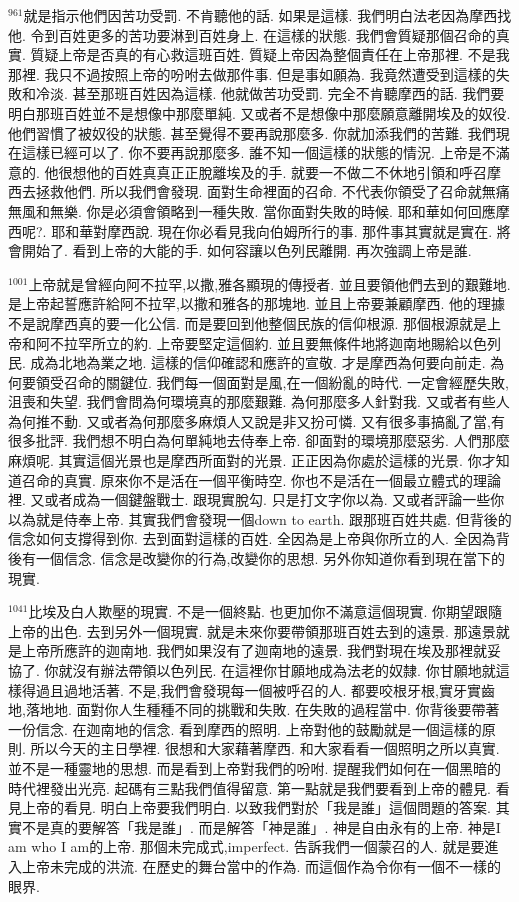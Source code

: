 \documentclass{book}
\begin{document}
$^{961}$就是指示他們因苦功受罰.
不肯聽他的話.
如果是這樣.
我們明白法老因為摩西找他.
令到百姓更多的苦功要淋到百姓身上.
在這樣的狀態.
我們會質疑那個召命的真實.
質疑上帝是否真的有心救這班百姓.
質疑上帝因為整個責任在上帝那裡.
不是我那裡.
我只不過按照上帝的吩咐去做那件事.
但是事如願為.
我竟然遭受到這樣的失敗和冷淡.
甚至那班百姓因為這樣.
他就做苦功受罰.
完全不肯聽摩西的話.
我們要明白那班百姓並不是想像中那麼單純.
又或者不是想像中那麼願意離開埃及的奴役.
他們習慣了被奴役的狀態.
甚至覺得不要再說那麼多.
你就加添我們的苦難.
我們現在這樣已經可以了.
你不要再說那麼多.
誰不知一個這樣的狀態的情況.
上帝是不滿意的.
他很想他的百姓真真正正脫離埃及的手.
就要一不做二不休地引領和呼召摩西去拯救他們.
所以我們會發現.
面對生命裡面的召命.
不代表你領受了召命就無痛無風和無樂.
你是必須會領略到一種失敗.
當你面對失敗的時候.
耶和華如何回應摩西呢?.
耶和華對摩西說.
現在你必看見我向伯姆所行的事.
那件事其實就是實在.
將會開始了.
看到上帝的大能的手.
如何容讓以色列民離開.
再次強調上帝是誰.

$^{1001}$上帝就是曾經向阿不拉罕,以撒,雅各顯現的傳授者.
並且要領他們去到的艱難地.
是上帝起誓應許給阿不拉罕,以撒和雅各的那塊地.
並且上帝要兼顧摩西.
他的理據不是說摩西真的要一化公信.
而是要回到他整個民族的信仰根源.
那個根源就是上帝和阿不拉罕所立的約.
上帝要堅定這個約.
並且要無條件地將迦南地賜給以色列民.
成為北地為業之地.
這樣的信仰確認和應許的宣敬.
才是摩西為何要向前走.
為何要領受召命的關鍵位.
我們每一個面對是風,在一個紛亂的時代.
一定會經歷失敗,沮喪和失望.
我們會問為何環境真的那麼艱難.
為何那麼多人針對我.
又或者有些人為何推不動.
又或者為何那麼多麻煩人又說是非又扮可憐.
又有很多事搞亂了當,有很多批評.
我們想不明白為何單純地去侍奉上帝.
卻面對的環境那麼惡劣.
人們那麼麻煩呢.
其實這個光景也是摩西所面對的光景.
正正因為你處於這樣的光景.
你才知道召命的真實.
原來你不是活在一個平衡時空.
你也不是活在一個最立體式的理論裡.
又或者成為一個鍵盤戰士.
跟現實脫勾.
只是打文字你以為.
又或者評論一些你以為就是侍奉上帝.
其實我們會發現一個down to earth.
跟那班百姓共處.
但背後的信念如何支撐得到你.
去到面對這樣的百姓.
全因為是上帝與你所立的人.
全因為背後有一個信念.
信念是改變你的行為,改變你的思想.
另外你知道你看到現在當下的現實.

$^{1041}$比埃及白人欺壓的現實.
不是一個終點.
也更加你不滿意這個現實.
你期望跟隨上帝的出色.
去到另外一個現實.
就是未來你要帶領那班百姓去到的遠景.
那遠景就是上帝所應許的迦南地.
我們如果沒有了迦南地的遠景.
我們對現在埃及那裡就妥協了.
你就沒有辦法帶領以色列民.
在這裡你甘願地成為法老的奴隸.
你甘願地就這樣得過且過地活著.
不是,我們會發現每一個被呼召的人.
都要咬根牙根,實牙實齒地,落地地.
面對你人生種種不同的挑戰和失敗.
在失敗的過程當中.
你背後要帶著一份信念.
在迦南地的信念.
看到摩西的照明.
上帝對他的鼓勵就是一個這樣的原則.
所以今天的主日學裡.
很想和大家藉著摩西.
和大家看看一個照明之所以真實.
並不是一種靈地的思想.
而是看到上帝對我們的吩咐.
提醒我們如何在一個黑暗的時代裡發出光亮.
起碼有三點我們值得留意.
第一點就是我們要看到上帝的體見.
看見上帝的看見.
明白上帝要我們明白.
以致我們對於「我是誰」這個問題的答案.
其實不是真的要解答「我是誰」.
而是解答「神是誰」.
神是自由永有的上帝.
神是I am who I am的上帝.
那個未完成式,imperfect.
告訴我們一個蒙召的人.
就是要進入上帝未完成的洪流.
在歷史的舞台當中的作為.
而這個作為令你有一個不一樣的眼界.
\end{document}
